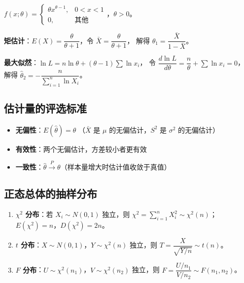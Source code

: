 \documentclass[12pt, a4paper]{article}
\begin{document}
\begin{tcolorbox}[exbox, title={矩估计与MLE综合例题}]
    $f(x;\theta)=\begin{cases}\theta x^{\theta-1}, & 0<x<1\\0, & \text{其他}\end{cases}$，$\theta>0$。

    \textbf{矩估计}：$E(X)=\dfrac{\theta}{\theta+1}$，令 $\bar{X}=\dfrac{\theta}{\theta+1}$，
    解得 $\hat{\theta}_1=\dfrac{\bar{X}}{1-\bar{X}}$。

    \textbf{最大似然}：$\ln L=n\ln\theta+(\theta-1)\sum\ln x_i$，
    令 $\dfrac{d\ln L}{d\theta}=\dfrac{n}{\theta}+\sum\ln x_i=0$，
    解得 $\hat{\theta}_2=-\dfrac{n}{\sum_{i=1}^n\ln X_i}$。
\end{tcolorbox}

\subsection{估计量的评选标准}

\begin{itemize}
    \item \textbf{无偏性}：$E(\hat{\theta})=\theta$
          （$\bar{X}$ 是 $\mu$ 的无偏估计，$S^2$ 是 $\sigma^2$ 的无偏估计）
    \item \textbf{有效性}：两个无偏估计，方差较小者更有效
    \item \textbf{一致性}：$\hat{\theta}\xrightarrow{P}\theta$（样本量增大时估计值收敛于真值）
\end{itemize}

\subsection{正态总体的抽样分布}

\begin{tcolorbox}[thmbox, title={三大抽样分布}]
    \begin{enumerate}
        \item \textbf{$\chi^2$ 分布}：若 $X_i\sim N(0,1)$ 独立，则
              $\chi^2=\sum_{i=1}^n X_i^2\sim\chi^2(n)$；
              $E(\chi^2)=n$，$D(\chi^2)=2n$。
        \item \textbf{$t$ 分布}：$X\sim N(0,1)$，$Y\sim\chi^2(n)$ 独立，则
              $T=\dfrac{X}{\sqrt{Y/n}}\sim t(n)$。
        \item \textbf{$F$ 分布}：$U\sim\chi^2(n_1)$，$V\sim\chi^2(n_2)$ 独立，则
              $F=\dfrac{U/n_1}{V/n_2}\sim F(n_1,n_2)$。
    \end{enumerate}
\end{tcolorbox}
\end{document}
